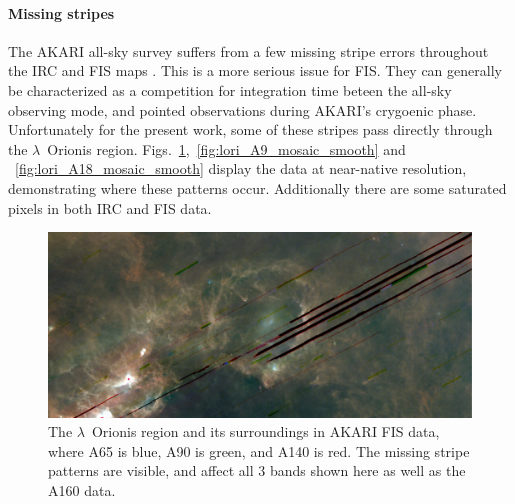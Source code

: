         \paragraph{Missing stripes}
          The AKARI all-sky survey suffers from a few missing stripe errors throughout the IRC and FIS maps \citep{ishihara10, doi15}. This is a more serious issue for FIS. They can generally be characterized as a competition for integration time beteen the all-sky observing mode, and pointed observations during AKARI's crygoenic phase. Unfortunately for the present work, some of these stripes pass directly through the $\lambda$~Orionis region. Figs.~\ref{fig:LOri_FIS_color},~\ref{fig:lori_A9_mosaic_smooth} and ~\ref{fig:lori_A18_mosaic_smooth} display the data at near-native resolution, demonstrating where these patterns occur. Additionally there are some saturated pixels in both IRC and FIS data.
            \begin{figure}
              \includegraphics[width=\textwidth]{../Plots/ch_lori/lori_fis_rgb.pdf}
              \centering
              \caption{The $\lambda$~Orionis region and its surroundings in AKARI FIS data, where A65 is blue, A90 is green, and A140 is red. The missing stripe patterns are visible, and affect all 3 bands shown here as well as the A160 data. }
              \label{fig:LOri_FIS_color}
            \end{figure}
